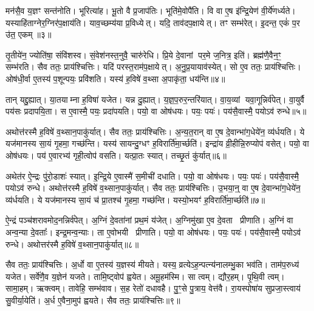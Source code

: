 मन॑सै॒व य॒ज्ञꣳ सन्त॑नोति।
भूरित्या॑ह।
भू॒तो वै प्र॒जाप॑तिः।
भूति॑मे॒वोपै॑ति।
वि वा ए॒ष इ॑न्द्रि॒येण॑ वी॒र्ये॑णर्ध्यते।
यस्याहि॑ताग्नेर॒ग्निर॑प॒क्षाय॑ति।
याव॒च्छम्य॑या प्र॒विध्येत्।
यदि॒ ताव॑दप॒क्षायेत्।
तꣳ सम्भ॑रेत्।
इ॒दन्त॒ एकं॑ प॒र उ॑त॒ एकम्॥३॥

तृ॒तीये॑न॒ ज्योति॑षा॒ संवि॑शस्व।
सं॒वेश॑नस्त॒नुवै॒ चारु॑रेधि।
प्रि॒ये दे॒वानां पर॒मे ज॒नित्र॒ इति॑।
ब्रह्म॑णै॒वैन॒ꣳ॒ सम्भ॑रति।
सैव ततः॒ प्राय॑श्चित्तिः।
यदि॑ परस्त॒राम॑प॒क्षायेत्।
अ॒नु॒प्र॒यायाव॑स्येत्।
सो ए॒व ततः॒ प्राय॑श्चित्तिः।
ओष॑धी॒र्वा ए॒तस्य॑ प॒शून्पयः॒ प्रवि॑शति।
यस्य॑ ह॒विषे॑ व॒थ्सा अ॒पाकृ॑ता॒ धय॑न्ति॥४॥

तान् यद्दु॒ह्यात्।
या॒तयाम्ना ह॒विषा॑ यजेत।
यन्न दु॒ह्यात्।
य॒ज्ञ॒प॒रुर॒न्तरि॑यात्।
वा॒य॒व्यां यवा॒गून्निर्व॑पेत्।
वा॒युर्वै पय॑सः प्रदापयि॒ता।
स ए॒वास्मै॒ पयः॒ प्रदा॑पयति।
पयो॒ वा ओष॑धयः।
पयः॒ पयः॑।
पय॑सै॒वास्मै॒ पयो\-ऽव॑ रुन्धे॥५॥

अथोत्त॑रस्मै ह॒विषे॑ व॒थ्सान॒पाकु॑र्यात्।
सैव ततः॒ प्राय॑श्चित्तिः।
अ॒न्य॒त॒रान् वा ए॒ष दे॒वान्भा॑ग॒धेये॑न॒ व्य॑र्धयति।
ये यज॑मानस्य सा॒यं गृ॒हमा॒ गच्छ॑न्ति।
यस्य॑ सायन्दु॒ग्धꣳ ह॒विरार्ति॑मा॒र्च्छति॑।
इन्द्रा॑य व्री॒हीन्नि॒रुप्योप॑ वसेत्।
पयो॒ वा ओष॑धयः।
पय॑ ए॒वारभ्य॑ गृही॒त्वोप॑ वसति।
यत्प्रा॒तः स्यात्।
तच्छृ॒तं कु॑र्यात्॥६॥

अथेत॑र ऐ॒न्द्रः पु॑रो॒डाशः॑ स्यात्।
इ॒न्द्रि॒ये ए॒वास्मै॑ स॒मीची॑ दधाति।
पयो॒ वा ओष॑धयः।
पयः॒ पयः॑।
पय॑सै॒वास्मै॒ पयो\-ऽव॑ रुन्धे।
अथोत्त॑रस्मै ह॒विषे॑ व॒थ्सान॒पाकु॑र्यात्।
सैव ततः॒ प्राय॑श्चित्तिः।
उ॒भया॒न्॒ वा ए॒ष दे॒वान्भा॑ग॒धेये॑न॒ व्य॑र्धयति।
ये यज॑मानस्य सा॒यं च॑ प्रा॒तश्च॑ गृ॒हमा॒ गच्छ॑न्ति।
यस्यो॒भयꣳ॑ ह॒विरार्ति॑मा॒र्च्छति॑॥७॥

ऐ॒न्द्रं पञ्च॑शरावमोद॒नन्निर्व॑पेत्।
अ॒ग्निं दे॒वता॑नां प्रथ॒मं य॑जेत्।
अ॒ग्निमु॑खा ए॒व दे॒वता प्रीणाति।
अ॒ग्निं वा अन्व॒न्या दे॒वताः᳚।
इन्द्र॒मन्व॒न्याः।
ता ए॒वोभयी प्रीणाति।
पयो॒ वा ओष॑धयः।
पयः॒ पयः॑।
पय॑सै॒वास्मै॒ पयो\-ऽव॑ रुन्धे।
अथोत्तर॑स्मै ह॒विषे॑ व॒थ्सान॒पाकु॑र्यात्॥८॥

सैव ततः॒ प्राय॑श्चित्तिः।
अ॒र्धो वा ए॒तस्य॑ य॒ज्ञस्य॑ मीयते।
यस्य॒ व्रत्ये\-ऽह॒न्पत्न्य॑नालम्भु॒का भव॑ति।
ताम॑प॒रुध्य॑ यजेत।
सर्वे॑णै॒व य॒ज्ञेन॑ यजते।
तामि॒ष्ट्वोप॑ ह्वयेत।
अमू॒हम॑स्मि।
सा त्वम्।
द्यौर॒हम्।
पृ॒थि॒वी त्वम्।
सामा॒हम्।
ऋक्त्वम्।
तावेहि॒ सम्भ॑वाव।
स॒ह रेतो॑ दधावहै।
पु॒ꣳ॒से पु॒त्राय॒ वेत्त॑वै।
रा॒यस्पोषा॑य सुप्रजा॒स्त्वाय॑ सु॒वीर्या॒येति॑।
अ॒र्ध ए॒वैना॒मुप॑ ह्वयते।
सैव ततः॒ प्राय॑श्चित्तिः॥९॥\anuvakamend[द॒धा॒ति॒ य॒ज्ञ उ॑त॒ एक॒न्धय॑न्ति रुन्धे कुर्यादा॒र्च्छत्य॒पाकु॑र्यात्पृथि॒वी त्वम॒ष्टौ च॑ (सर्वा॒न्॒ वि वै यदि॑ परस्त॒रामोष॑धीरन्यत॒रानु॒भया॑न॒र्धो वै॥)]

